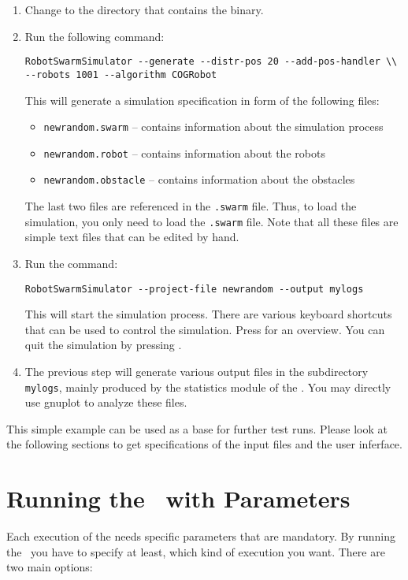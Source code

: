 \documentclass[a4paper,halfparskip,11pt,twoside]{scrartcl}
\newcommand{\gnuplot}{ {\sffamily gnuplot}\xspace}
\begin{document}
\begin{enumerate}
	\item Change to the directory that contains the \RSS binary.
	\item Run the following command:

		\texttt{RobotSwarmSimulator -{}-generate -{}-distr-pos 20 -{}-add-pos-handler \textbackslash\textbackslash
			\linebreak -{}-robots 1001 -{}-algorithm COGRobot}

		This will generate a simulation specification in form of the following files:
		\begin{itemize}
			\item {\tt newrandom.swarm} -- contains information about the simulation process
			\item {\tt newrandom.robot} -- contains information about the robots
			\item {\tt newrandom.obstacle} -- contains information about the obstacles
		\end{itemize}
		The last two files are referenced in the {\tt .swarm} file. Thus, to load the simulation, you only need to load the {\tt .swarm} file. Note that all these files
are simple text files that can be edited by hand.
	\item Run the command:

		\centerline{\tt RobotSwarmSimulator -{}-project-file newrandom -{}-output mylogs}

		This will start the simulation process. There are various keyboard shortcuts that can be used to control the simulation. Press  for an overview. You can quit the simulation by pressing .
	\item The previous step will generate various output files in the subdirectory {\tt mylogs}, mainly produced by the statistics module of the \RSS. You may directly use \gnuplot to analyze these files.
\end{enumerate}
This simple example can be used as a base for further test runs. Please look at the following sections to get specifications of the input files and the user inferface.

\section{Running the \RSS\ with Parameters}
Each execution of the \RSS needs specific parameters that are mandatory. By running the \RSS\ you have to specify at least, which kind of execution you want. There are two main options:
\end{document}
